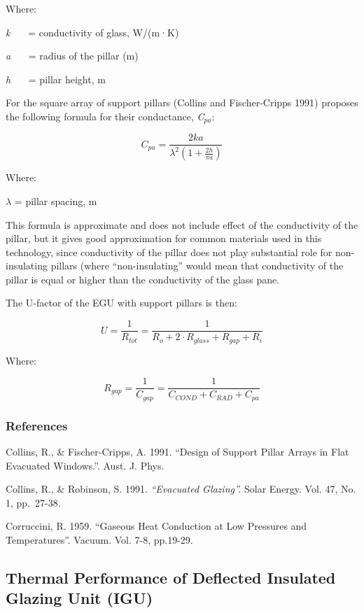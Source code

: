 Where:

\emph{k}~~~ = conductivity of glass, W/(m·K)

\emph{a}~~~ = radius of the pillar (m)

\emph{h}~~~ = pillar height, m

For the square array of support pillars (Collins and Fischer-Cripps 1991) proposes the following formula for their conductance, \emph{C}\(_{pa}\):

\begin{equation}
{C_{pa}} = \frac{{2ka}}{{{\lambda ^2}\left( {1 + \frac{{2h}}{{\pi a}}} \right)}}
\end{equation}

Where:

$\lambda$ = pillar spacing, m

This formula is approximate and does not include effect of the conductivity of the pillar, but it gives good approximation for common materials used in this technology, since conductivity of the pillar does not play substantial role for non-insulating pillars (where ``non-insulating'' would mean that conductivity of the pillar is equal or higher than the conductivity of the glass pane.

The U-factor of the EGU with support pillars is then:

\begin{equation}
U = \frac{1}{{{R_{tot}}}} = \frac{1}{{{R_o} + 2 \cdot {R_{glass}} + {R_{gap}} + {R_i}}}
\end{equation}

Where:

\begin{equation}
{R_{gap}} = \frac{1}{{{C_{gap}}}} = \frac{1}{{{C_{COND}} + {C_{RAD}} + {C_{pa}}}}
\end{equation}

\subsubsection{References}\label{references-055}

Collins, R., \& Fischer-Cripps, A. 1991. ``Design of Support Pillar Arrays in Flat Evacuated Windows.''. Aust. J. Phys.

Collins, R., \& Robinson, S. 1991. \emph{``Evacuated Glazing''.} Solar Energy. Vol. 47, No. 1, pp.~27-38.

Corruccini, R. 1959. ``Gaseous Heat Conduction at Low Pressures and Temperatures''. Vacuum. Vol. 7-8, pp.19-29.

\subsection{Thermal Performance of Deflected Insulated Glazing Unit (IGU)}\label{thermal-performance-of-deflected-insulated-glazing-unit-igu}

